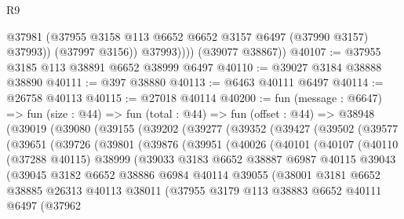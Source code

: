 \begin{lexlean}{R9}
\begin{coremodule}
                  @37981
                  (@37955 @3158 @113 @6652 @6652 @3157 @6497 (@37990 @3157) @37993))
                (@37997 @3156))
              @37993))))
      (@39077 @38867))
@40107 := @37955 @3185 @113 @38891 @6652 @38999 @6497
@40110 := @39027 @3184 @38888 @38890
@40111 := @397 @38880
@40113 := @6463 @40111 @6497
@40114 := @26758 @40113
@40115 := @27018 @40114
@40200 := fun (message : @6647) =>
  fun (size : @44) =>
  fun (total : @44) =>
  fun (offset : @44) =>
  @38948
    (@39019
      (@39080
        (@39155
          (@39202
            (@39277
              (@39352
                (@39427
                  (@39502
                    (@39577
                      (@39651
                        (@39726
                          (@39801
                            (@39876
                              (@39951
                                (@40026
                                  (@40101
                                    (@40107
                                      (@40110
                                        (@37288 @40115)
                                        @38999
                                        (@39033
                                          @3183
                                          @6652
                                          @38887
                                          @6987
                                          @40115
                                          @39043
                                          (@39045
                                            @3182
                                            @6652
                                            @38886
                                            @6984
                                            @40114
                                            @39055
                                            (@38001
                                              @3181
                                              @6652
                                              @38885
                                              @26313
                                              @40113
                                              @38011
                                              (@37955
                                                @3179
                                                @113
                                                @38883
                                                @6652
                                                @40111
                                                @6497
                                                (@37962

\end{coremodule}
\end{lexlean}
